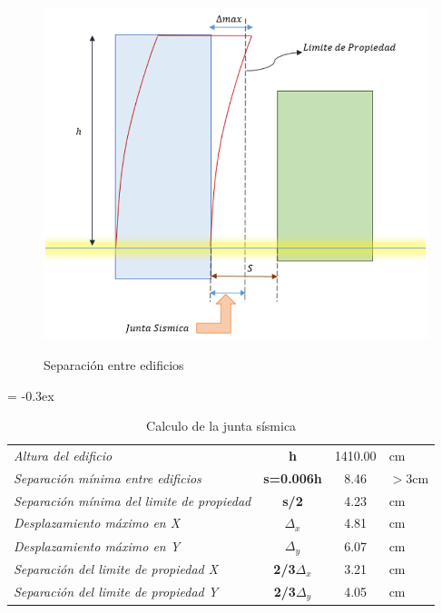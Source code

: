 \documentclass[12pt]{article}
\begin{document}
\begin{figure}[h!]
    \centering
    \caption{Separación entre edificios}
    \includegraphics[scale=0.67]{IMAGENES/23.PNG}
    \label{ver}
\end{figure}
\newpage
\begin{table}[h!]
  \centering
  \caption{Calculo de la junta sísmica}
  \vspace{0.5cm}
      {
\extrarowheight = -0.3ex
\renewcommand{\arraystretch}{1.35}
    \begin{tabular}{l|c|c|l}
\cline{2-3}    \textit{Altura del edificio } & \textbf{h} & 1410.00 & cm \\
\cline{2-3}    \textit{Separación mínima entre edificios } & \textbf{s=0.006h} & 8.46  & $>$3cm \\
\cline{2-3}    \textit{Separación mínima del limite de propiedad} & \textbf{s/2} & 4.23  & cm \\
\cline{2-3}    \textit{Desplazamiento máximo en X } & \textbf{$\Delta _{x}$} & 4.81  & cm \\
\cline{2-3}    \textit{Desplazamiento máximo en Y } & \textbf{$\Delta _{y}$} & 6.07  & cm \\
\cline{2-3}    \textit{Separación del limite de propiedad X} & \textbf{2/3$\Delta _{x}$} & 3.21  & cm \\
\cline{2-3}    \textit{Separación del limite de propiedad Y} & \textbf{2/3$\Delta _{y}$} & 4.05  & cm \\
\cline{2-3}    \end{tabular}%
}
  \label{jun}%
\end{table}%
\end{document}
